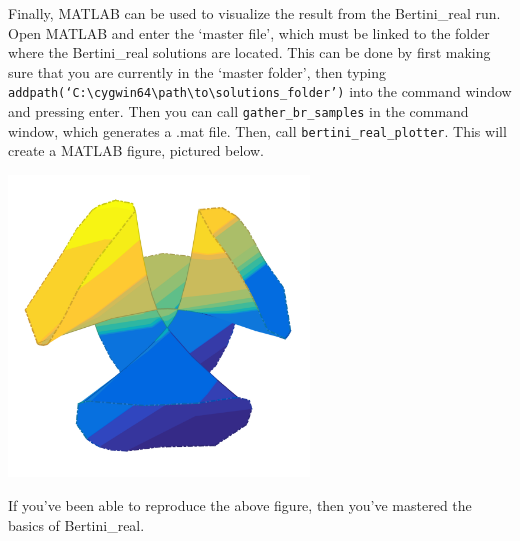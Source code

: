 Finally, MATLAB can be used to visualize the result from the Bertini\_real run. Open MATLAB and enter the `master file', which must be linked to the folder where the Bertini\_real solutions are located. This can be done by first making sure that you are currently in the `master folder', then typing \texttt{addpath(`C:\textbackslash{cygwin64}\textbackslash{path}\textbackslash{to}\textbackslash{solutions\_folder}')} into the command window and pressing enter. Then you can call \texttt{gather\_br\_samples} in the command window, which generates a .mat file. Then, call \texttt{bertini\_real\_plotter\-}. This will create a MATLAB figure, pictured below.

\begin{center}\begin{minipage}{0.9\linewidth}
\centering
\includegraphics[width=0.6\textwidth]{CayleyCubic}
\end{minipage}\end{center}


If you've been able to reproduce the above figure, then you've mastered the basics of Bertini\_real. 






